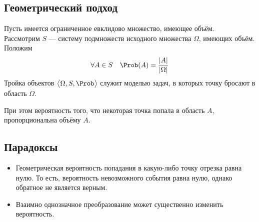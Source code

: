 \subsection{Геометрический подход}
Пусть имеется ограниченное евклидово множество, имеющее объём. \\
Рассмотрим $S$ --- систему подмножеств исходного множества $\Omega$, имеющих объём. Положим
\[
	\forall A \in S \quad \Prob(A) = \frac{\vert {A} \vert}{\vert \Omega \vert}
\]
Тройка объектов $ \big<\Omega, S, \Prob\big> $ служит моделью задач, в которых точку бросают в область $\Omega$.
\smallskip

При этом вероятность того, что некоторая точка попала в область $A$, пропорциональна объёму $A$.
\subsection{Парадоксы}
\begin{itemize}
	\item Геометрическая вероятность попадания в какую-либо точку отрезка равна нулю.
	      То есть, вероятность невозможного события равна нулю, однако обратное не является верным.
	\item Взаимно однозначное преобразование может существенно изменить вероятность.
\end{itemize}
